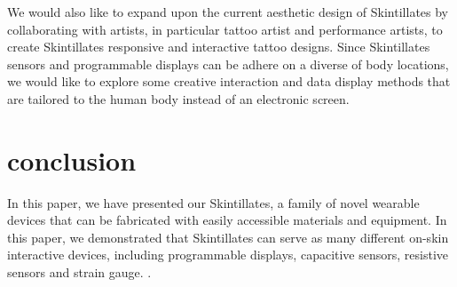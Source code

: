 \documentclass{sigchi}
\begin{document}
We would also like to expand upon the current aesthetic design of Skintillates by collaborating with artists, in particular tattoo artist and performance artists, to create Skintillates responsive and interactive tattoo designs. Since Skintillates sensors and programmable displays can be adhere on a diverse of body locations, we would like to explore some creative interaction and data display methods that are tailored to the human body instead of an electronic screen. 

\section {conclusion}
In this paper, we have presented our Skintillates, a family of novel wearable devices that can be fabricated with easily accessible materials and equipment. In this paper, we demonstrated that Skintillates can serve as many different on-skin interactive devices, including programmable displays, capacitive sensors, resistive sensors and strain gauge. 
 \cite{Kim:2015ii}.





%
%
%
%
%
\balance



\end{document}
